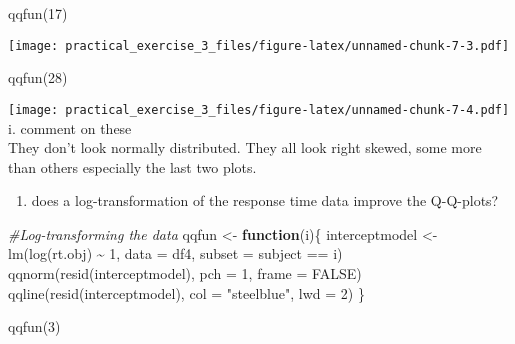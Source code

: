 \documentclass[
]{article}
\newenvironment{Shaded}{\begin{snugshade}}{\end{snugshade}}
\newcommand{\AttributeTok}[1]{\textcolor[rgb]{0.77,0.63,0.00}{#1}}
\newcommand{\CommentTok}[1]{\textcolor[rgb]{0.56,0.35,0.01}{\textit{#1}}}
\newcommand{\ConstantTok}[1]{\textcolor[rgb]{0.00,0.00,0.00}{#1}}
\newcommand{\ControlFlowTok}[1]{\textcolor[rgb]{0.13,0.29,0.53}{\textbf{#1}}}
\newcommand{\DecValTok}[1]{\textcolor[rgb]{0.00,0.00,0.81}{#1}}
\newcommand{\FunctionTok}[1]{\textcolor[rgb]{0.00,0.00,0.00}{#1}}
\newcommand{\NormalTok}[1]{#1}
\newcommand{\OtherTok}[1]{\textcolor[rgb]{0.56,0.35,0.01}{#1}}
\newcommand{\SpecialCharTok}[1]{\textcolor[rgb]{0.00,0.00,0.00}{#1}}
\newcommand{\StringTok}[1]{\textcolor[rgb]{0.31,0.60,0.02}{#1}}
\providecommand{\tightlist}{%
  \setlength{\itemsep}{0pt}\setlength{\parskip}{0pt}}
\begin{document}
\begin{Shaded}
\begin{Highlighting}[]
\FunctionTok{qqfun}\NormalTok{(}\DecValTok{17}\NormalTok{)}
\end{Highlighting}
\end{Shaded}

\texttt{[image: practical\_exercise\_3\_files/figure-latex/unnamed-chunk-7-3.pdf]}

\begin{Shaded}
\begin{Highlighting}[]
\FunctionTok{qqfun}\NormalTok{(}\DecValTok{28}\NormalTok{)}
\end{Highlighting}
\end{Shaded}

\texttt{[image: practical\_exercise\_3\_files/figure-latex/unnamed-chunk-7-4.pdf]}
i. comment on these\\
They don't look normally distributed. They all look right skewed, some
more than others especially the last two plots.

\begin{enumerate}
\def\labelenumi{\roman{enumi}.}
\setcounter{enumi}{1}
\tightlist
\item
  does a log-transformation of the response time data improve the
  Q-Q-plots?
\end{enumerate}

\begin{Shaded}
\begin{Highlighting}[]
\CommentTok{\#Log{-}transforming the data }
\NormalTok{qqfun }\OtherTok{\textless{}{-}} \ControlFlowTok{function}\NormalTok{(i)\{}
\NormalTok{  interceptmodel }\OtherTok{\textless{}{-}} \FunctionTok{lm}\NormalTok{(}\FunctionTok{log}\NormalTok{(rt.obj) }\SpecialCharTok{\textasciitilde{}} \DecValTok{1}\NormalTok{, }\AttributeTok{data =}\NormalTok{ df4, }\AttributeTok{subset =}\NormalTok{ subject }\SpecialCharTok{==}\NormalTok{ i)}
  \FunctionTok{qqnorm}\NormalTok{(}\FunctionTok{resid}\NormalTok{(interceptmodel), }\AttributeTok{pch =} \DecValTok{1}\NormalTok{, }\AttributeTok{frame =} \ConstantTok{FALSE}\NormalTok{)}
  \FunctionTok{qqline}\NormalTok{(}\FunctionTok{resid}\NormalTok{(interceptmodel), }\AttributeTok{col =} \StringTok{"steelblue"}\NormalTok{, }\AttributeTok{lwd =} \DecValTok{2}\NormalTok{)}
\NormalTok{\}}


\FunctionTok{qqfun}\NormalTok{(}\DecValTok{3}\NormalTok{)}
\end{Highlighting}
\end{Shaded}
\end{document}
